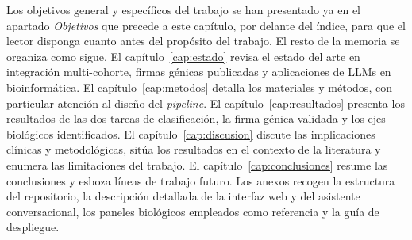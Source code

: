 Los objetivos general y específicos del trabajo se han presentado ya en
el apartado \emph{Objetivos} que precede a este capítulo, por delante del
índice, para que el lector disponga cuanto antes del propósito del
trabajo. El resto de la memoria se organiza como sigue. El
capítulo~\ref{cap:estado} revisa el estado del arte en integración
multi-cohorte, firmas génicas publicadas y aplicaciones de LLMs en
bioinformática. El capítulo~\ref{cap:metodos} detalla los materiales y
métodos, con particular atención al diseño del \emph{pipeline}. El
capítulo~\ref{cap:resultados} presenta los resultados de las dos tareas
de clasificación, la firma génica validada y los ejes biológicos
identificados. El capítulo~\ref{cap:discusion} discute las implicaciones
clínicas y metodológicas, sitúa los resultados en el contexto de la
literatura y enumera las limitaciones del trabajo. El
capítulo~\ref{cap:conclusiones} resume las conclusiones y esboza líneas
de trabajo futuro. Los anexos recogen la estructura del repositorio, la
descripción detallada de la interfaz web y del asistente conversacional,
los paneles biológicos empleados como referencia y la guía de despliegue.
